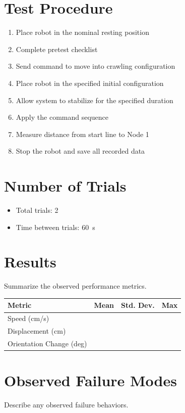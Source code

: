 \documentclass[11pt]{article}
\begin{document}
\section*{Test Procedure}
\begin{enumerate}[noitemsep]
    \item Place robot in the nominal resting position
    \item Complete pretest checklist
    \item Send command to move into crawling configuration
    \item Place robot in the specified initial configuration
    \item Allow system to stabilize for the specified duration
    \item Apply the command sequence
    \item Measure distance from start line to Node 1
    \item Stop the robot and save all recorded data
\end{enumerate}

\section*{Number of Trials}
\begin{itemize}[noitemsep]
    \item Total trials: 2
    \item Time between trials: 60~s
\end{itemize}

\section*{Results}
Summarize the observed performance metrics.

\begin{center}
\begin{tabular}{lccc}
\toprule
Metric & Mean & Std. Dev. & Max \\
\midrule
Speed (cm/s) &  &  &  \\
Displacement (cm) &  &  &  \\
Orientation Change (deg) &  &  &  \\
\bottomrule
\end{tabular}
\end{center}

\section*{Observed Failure Modes}
Describe any observed failure behaviors.
\end{document}
